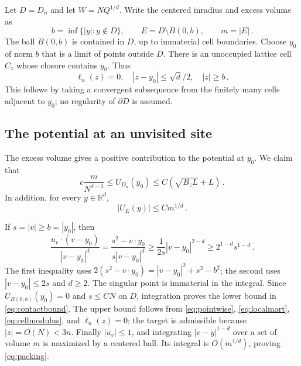 \documentclass[11pt]{amsart}
\theoremstyle{plain}
\theoremstyle{definition}
\newcommand{\R}{\mathbb R}
\begin{document}
Let $D=D_n$ and let $W=NQ^{1/d}$. Write the centered inradius and excess volume as
\begin{equation}\label{eq:bm}
 b=\inf\{|y|:y\notin D\},\qquad E=D\setminus B(0,b),\qquad m=|E|\, .
\end{equation}
The ball $B(0,b)$ is contained in $D$, up to immaterial cell boundaries.
Choose $y_0$ of norm $b$ that is a limit of points outside $D$.
There is an unoccupied lattice cell $C_z$ whose closure contains $y_0$.
Thus
\begin{equation}\label{eq:contactcell}
 \ell_n(z)=0,\quad |z-y_0|\leq\sqrt d/2,\quad |z|\geq b\, .
\end{equation}
This follows by taking a convergent subsequence from the finitely
many cells adjacent to $y_0$; no regularity of $\partial D$ is assumed.

\subsection{The potential at an unvisited site}
The excess volume gives a positive contribution to the potential at $y_0$.
We claim that
\begin{equation}\label{eq:contactbound}
c\frac{m}{N^{d-1}}\leq U_{D_n}(y_0)
\leq C(\sqrt{B_zL}+L)\, .
\end{equation}
In addition, for every $y\in\R^d$,
\begin{equation}\label{eq:packing}
|U_E(y)|\leq Cm^{1/d}\, .
\end{equation}

If $s=|v|\geq b=|y_0|$, then
\[
 \frac{u_v\cdot(v-y_0)}{|v-y_0|^d}
 =\frac{s^2-v\cdot y_0}{s|v-y_0|^d}
 \geq\frac1{2s}|v-y_0|^{2-d}
 \geq 2^{1-d}s^{1-d}\, .
\]
The first inequality uses
$2(s^2-v\cdot y_0)=|v-y_0|^2+s^2-b^2$; the second uses
$|v-y_0|\leq2s$ and $d\geq2$.
The singular point is immaterial in the integral. Since
$U_{B(0,b)}(y_0)=0$ and $s\leq CN$ on $D$, integration proves
the lower bound in \eqref{eq:contactbound}. The upper bound follows
from \eqref{eq:pointwise}, \eqref{eq:localmart}, \eqref{eq:cellmodulus}, and
$\ell_n(z)=0$; the target is admissible because $|z|=O(N)<3n$. Finally $|u_v|\leq1$, and integrating
$|v-y|^{1-d}$ over a set of volume $m$ is maximized by a centered ball.
Its integral is $O(m^{1/d})$, proving \eqref{eq:packing}.
\end{document}
